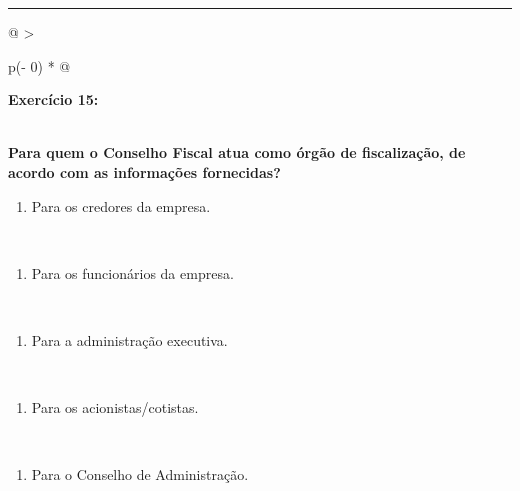 \documentclass[
]{book}
\providecommand{\tightlist}{%
  \setlength{\itemsep}{0pt}\setlength{\parskip}{0pt}}
\begin{document}
\begin{center}\rule{0.5\linewidth}{0.5pt}\end{center}

\begin{longtable}[]{@{}
  >{\raggedright\arraybackslash}p{(\columnwidth - 0\tabcolsep) * }@{}}
\toprule\noalign{}
\begin{minipage}[b]{\linewidth}\raggedright
\textbf{Exercício 15:}
\end{minipage} \\
\midrule\noalign{}
\endhead
\bottomrule\noalign{}
\endlastfoot
\textbf{Para quem o Conselho Fiscal atua como órgão de fiscalização, de acordo com as informações fornecidas?} \\
\begin{minipage}[t]{\linewidth}\raggedright
\begin{enumerate}
\def\labelenumi{\alph{enumi})}
\tightlist
\item
  Para os credores da empresa.
\end{enumerate}
\end{minipage} \\
\begin{minipage}[t]{\linewidth}\raggedright
\begin{enumerate}
\def\labelenumi{\alph{enumi})}
\setcounter{enumi}{1}
\tightlist
\item
  Para os funcionários da empresa.
\end{enumerate}
\end{minipage} \\
\begin{minipage}[t]{\linewidth}\raggedright
\begin{enumerate}
\def\labelenumi{\alph{enumi})}
\setcounter{enumi}{2}
\tightlist
\item
  Para a administração executiva.
\end{enumerate}
\end{minipage} \\
\begin{minipage}[t]{\linewidth}\raggedright
\begin{enumerate}
\def\labelenumi{\alph{enumi})}
\setcounter{enumi}{3}
\tightlist
\item
  Para os acionistas/cotistas.
\end{enumerate}
\end{minipage} \\
\begin{minipage}[t]{\linewidth}\raggedright
\begin{enumerate}
\def\labelenumi{\alph{enumi})}
\setcounter{enumi}{4}
\tightlist
\item
  Para o Conselho de Administração.
\end{enumerate}
\end{minipage} \\
\end{longtable}
\end{document}
